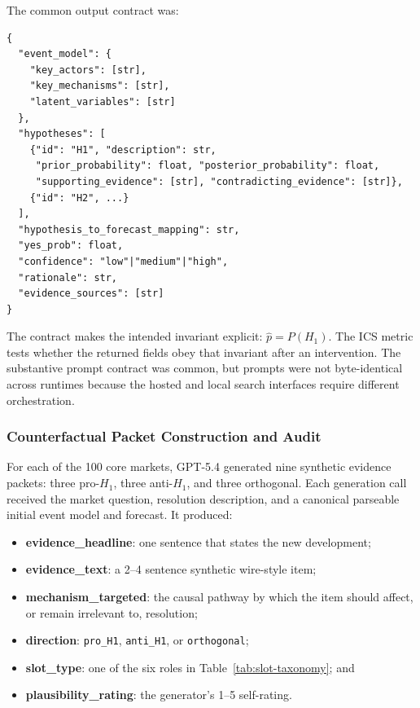 The common output contract was:

\begin{small}
\begin{verbatim}
{
  "event_model": {
    "key_actors": [str],
    "key_mechanisms": [str],
    "latent_variables": [str]
  },
  "hypotheses": [
    {"id": "H1", "description": str,
     "prior_probability": float, "posterior_probability": float,
     "supporting_evidence": [str], "contradicting_evidence": [str]},
    {"id": "H2", ...}
  ],
  "hypothesis_to_forecast_mapping": str,
  "yes_prob": float,
  "confidence": "low"|"medium"|"high",
  "rationale": str,
  "evidence_sources": [str]
}
\end{verbatim}
\end{small}

The contract makes the intended invariant explicit: \(\hat p=P(H_1)\).  The ICS
metric tests whether the returned fields obey that invariant after an intervention.
The substantive prompt contract was common, but prompts were not byte-identical across
runtimes because the hosted and local search interfaces require different orchestration.

\subsubsection{Counterfactual Packet Construction and Audit}
\label{app:cf-taxonomy}

For each of the 100 core markets, GPT-5.4 generated nine synthetic evidence packets:
three pro-$H_1$, three anti-$H_1$, and three orthogonal.  Each generation call received
the market question, resolution description, and a canonical parseable initial event
model and forecast.  It produced:

\begin{itemize}
  \item \textbf{evidence\_headline}: one sentence that states the new development;
  \item \textbf{evidence\_text}: a 2--4 sentence synthetic wire-style item;
  \item \textbf{mechanism\_targeted}: the causal pathway by which the item should
        affect, or remain irrelevant to, resolution;
  \item \textbf{direction}: \texttt{pro\_H1}, \texttt{anti\_H1}, or
        \texttt{orthogonal};
  \item \textbf{slot\_type}: one of the six roles in
        Table~\ref{tab:slot-taxonomy}; and
  \item \textbf{plausibility\_rating}: the generator's 1--5 self-rating.
\end{itemize}


